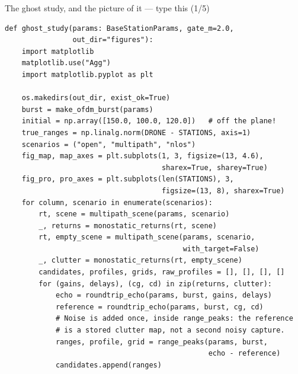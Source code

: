 \documentclass[10pt]{beamer}
\begin{document}
\begin{frame}[fragile]{The ghost study, and the picture of it --- type this (1/5)}
\begin{lstlisting}[basicstyle=\ttfamily\tiny]
def ghost_study(params: BaseStationParams, gate_m=2.0,
                out_dir="figures"):
    import matplotlib
    matplotlib.use("Agg")
    import matplotlib.pyplot as plt

    os.makedirs(out_dir, exist_ok=True)
    burst = make_ofdm_burst(params)
    initial = np.array([150.0, 100.0, 120.0])   # off the plane!
    true_ranges = np.linalg.norm(DRONE - STATIONS, axis=1)
    scenarios = ("open", "multipath", "nlos")
    fig_map, map_axes = plt.subplots(1, 3, figsize=(13, 4.6),
                                     sharex=True, sharey=True)
    fig_pro, pro_axes = plt.subplots(len(STATIONS), 3,
                                     figsize=(13, 8), sharex=True)
    for column, scenario in enumerate(scenarios):
        rt, scene = multipath_scene(params, scenario)
        _, returns = monostatic_returns(rt, scene)
        rt, empty_scene = multipath_scene(params, scenario,
                                          with_target=False)
        _, clutter = monostatic_returns(rt, empty_scene)
        candidates, profiles, grids, raw_profiles = [], [], [], []
        for (gains, delays), (cg, cd) in zip(returns, clutter):
            echo = roundtrip_echo(params, burst, gains, delays)
            reference = roundtrip_echo(params, burst, cg, cd)
            # Noise is added once, inside range_peaks: the reference
            # is a stored clutter map, not a second noisy capture.
            ranges, profile, grid = range_peaks(params, burst,
                                                echo - reference)
            candidates.append(ranges)
\end{lstlisting}
\end{frame}
\end{document}
